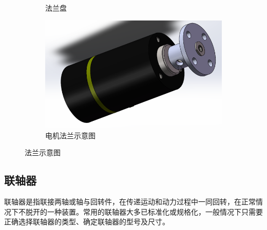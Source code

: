 \documentclass[UTF8]{article} %
\begin{document}
\begin{figure}[H]
\begin{subfigure}[b]{0.2\textwidth}
          \caption{法兰盘}
  \end{subfigure}
  \begin{subfigure}[b]{0.3\textwidth}
    \centering
    \includegraphics[width=\textwidth]{fa3.png}
    \caption{电机法兰示意图}
\end{subfigure}
  \caption{法兰示意图}
\end{figure}

\subsection{联轴器}
联轴器是指联接两轴或轴与回转件，在传递运动和动力过程中一同回转，在正常情况下不脱开的一种装置。常用的联轴器大多已标准化或规格化，一般情况下只需要正确选择联轴器的类型、确定联轴器的型号及尺寸。
\end{document}
